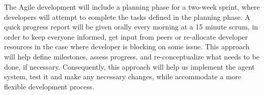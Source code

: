 \documentclass[12pt,a4paper]{article}
\begin{document}
		The Agile development will include a planning phase for a two-week sprint, where developers will attempt to complete the tasks defined in the planning phase. A quick progress report will be given orally every morning at a 15 minute scrum, in order to keep everyone informed, get input from peers or re-allocate developer resources in the case where developer is blocking on some issue. This approach will help define milestones, assess progress, and re-conceptualize what needs to be done, if necessary. Consequently, this approach will help us implement the agent system, test it and make any necessary changes, while accommodate a more flexible development process. 
		
\end{document}
